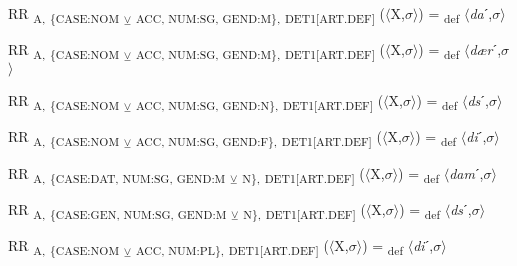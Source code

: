 {\begin{exe}
 RR \textsubscript{A,} \textsubscript{\{CASE:NOM} \textsubscript{${\veebar}$}\textsubscript{ ACC, NUM:SG, GEND:M\},} \textsubscript{DET1[ART.DEF]} ($\langle$X,$\sigma $$\rangle$) = \textsubscript{def} $\langle$\textit{da}ˊ,$\sigma $$\rangle$
\end{exe}

\begin{exe}
 RR \textsubscript{A,} \textsubscript{\{CASE:NOM} \textsubscript{${\veebar}$}\textsubscript{ ACC, NUM:SG, GEND:M\},} \textsubscript{DET1[ART.DEF]} ($\langle$X,$\sigma $$\rangle$) = \textsubscript{def} $\langle$\textit{dær}ˊ,$\sigma $$\rangle$
\end{exe}

\begin{exe}
 RR \textsubscript{A,} \textsubscript{\{CASE:NOM} \textsubscript{${\veebar}$}\textsubscript{ ACC, NUM:SG, GEND:N\},} \textsubscript{DET1[ART.DEF]} ($\langle$X,$\sigma $$\rangle$) = \textsubscript{def} $\langle$\textit{ds}ˊ,$\sigma $$\rangle$
\end{exe}

\begin{exe}
 RR \textsubscript{A,} \textsubscript{\{CASE:NOM} \textsubscript{${\veebar}$}\textsubscript{ ACC, NUM:SG, GEND:F\},} \textsubscript{DET1[ART.DEF]} ($\langle$X,$\sigma $$\rangle$) = \textsubscript{def} $\langle$\textit{di}ˊ,$\sigma $$\rangle$
\end{exe}

\begin{exe}
 RR \textsubscript{A,} \textsubscript{\{CASE:DAT, NUM:SG, GEND:M} \textsubscript{${\veebar}$}\textsubscript{ N\},} \textsubscript{DET1[ART.DEF]} ($\langle$X,$\sigma $$\rangle$) = \textsubscript{def} $\langle$\textit{dam}ˊ,$\sigma $$\rangle$
\end{exe}

\begin{exe}
 RR \textsubscript{A,} \textsubscript{\{CASE:GEN, NUM:SG, GEND:M} \textsubscript{${\veebar}$}\textsubscript{ N\},} \textsubscript{DET1[ART.DEF]} ($\langle$X,$\sigma $$\rangle$) = \textsubscript{def} $\langle$\textit{ds}ˊ,$\sigma $$\rangle$
\end{exe}

\begin{exe}
 RR \textsubscript{A,} \textsubscript{\{CASE:NOM} \textsubscript{${\veebar}$}\textsubscript{ ACC, NUM:PL\},} \textsubscript{DET1[ART.DEF]} ($\langle$X,$\sigma $$\rangle$) = \textsubscript{def} $\langle$\textit{di}ˊ,$\sigma $$\rangle$
\end{exe}

}
